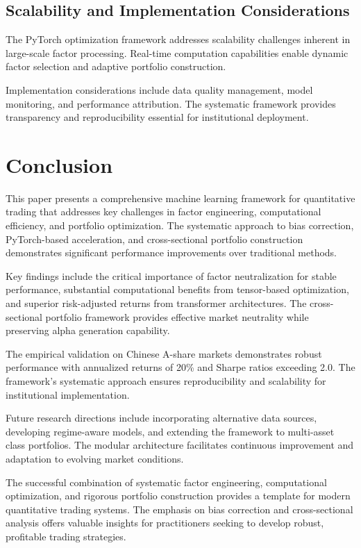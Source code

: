 \documentclass[conference]{IEEEtran}
\begin{document}
\subsection{Scalability and Implementation Considerations}

The PyTorch optimization framework addresses scalability challenges inherent in large-scale factor processing. Real-time computation capabilities enable dynamic factor selection and adaptive portfolio construction.

Implementation considerations include data quality management, model monitoring, and performance attribution. The systematic framework provides transparency and reproducibility essential for institutional deployment.

\section{Conclusion}

This paper presents a comprehensive machine learning framework for quantitative trading that addresses key challenges in factor engineering, computational efficiency, and portfolio optimization. The systematic approach to bias correction, PyTorch-based acceleration, and cross-sectional portfolio construction demonstrates significant performance improvements over traditional methods.

Key findings include the critical importance of factor neutralization for stable performance, substantial computational benefits from tensor-based optimization, and superior risk-adjusted returns from transformer architectures. The cross-sectional portfolio framework provides effective market neutrality while preserving alpha generation capability.

The empirical validation on Chinese A-share markets demonstrates robust performance with annualized returns of 20\% and Sharpe ratios exceeding 2.0. The framework's systematic approach ensures reproducibility and scalability for institutional implementation.

Future research directions include incorporating alternative data sources, developing regime-aware models, and extending the framework to multi-asset class portfolios. The modular architecture facilitates continuous improvement and adaptation to evolving market conditions.

The successful combination of systematic factor engineering, computational optimization, and rigorous portfolio construction provides a template for modern quantitative trading systems. The emphasis on bias correction and cross-sectional analysis offers valuable insights for practitioners seeking to develop robust, profitable trading strategies.
\end{document}
